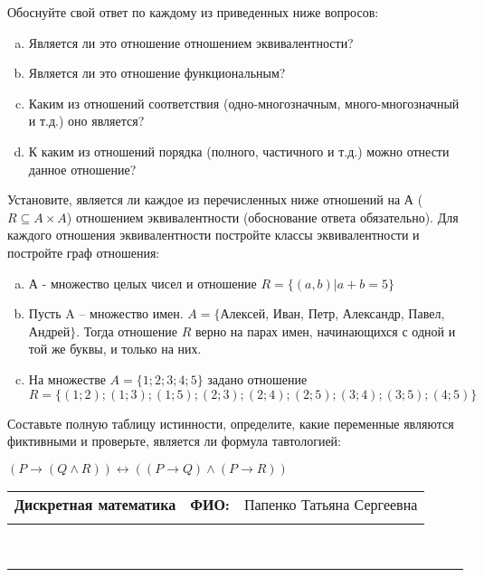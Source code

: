 \documentclass[10pt]{exam}
\newcommand{\class}{Дискретная математика}
\newcommand{\examdate}{}
\begin{document}
\begin{questions}
Обоснуйте свой ответ по каждому из приведенных ниже вопросов:
\begin{enumerate} [a)]\setcounter{enumi}{0}
    \item Является ли это отношение отношением эквивалентности?
    \item Является ли это отношение функциональным?
    \item Каким из отношений соответствия (одно-многозначным, много-многозначный и т.д.) оно является?
    \item К каким из отношений порядка (полного, частичного и т.д.) можно отнести данное отношение?
\end{enumerate}
\question
Установите, является ли каждое из перечисленных ниже отношений на А ($R \subseteq A \times A$) отношением эквивалентности (обоснование ответа обязательно). Для каждого отношения эквивалентности постройте классы 
эквивалентности и постройте граф отношения:
\begin{enumerate} [a)]\setcounter{enumi}{0}
\item А - множество целых чисел и отношение $R = \{(a,b)|a + b = 5\}$
\item Пусть A – множество имен. $A = \{ $Алексей, Иван, Петр, Александр, Павел, Андрей$ \}$. Тогда отношение $R $ верно на парах имен, начинающихся с одной и той же буквы, и только на них.
\item На множестве $A = \{1; 2; 3; 4; 5\}$ задано отношение $R = \{(1; 2); (1; 3); (1; 5); (2; 3); (2; 4); (2; 5); (3; 4); (3; 5); (4; 5)\}$
\end{enumerate}\question Составьте полную таблицу истинности, определите, какие переменные являются фиктивными и проверьте, является ли формула тавтологией:

$(P \rightarrow (Q \land R)) \leftrightarrow ((P \rightarrow Q) \land (P \rightarrow R))$

\end{questions}
\newpage
\begin{flushright}
\begin{tabular}{p{2.8in} r l}
\textbf{\class} & \textbf{ФИО:} &Папенко Татьяна Сергеевна
\\

\textbf{\examdate} &&\\
\end{tabular}\\
\end{flushright}
\rule[1ex]{\textwidth}{.1pt}
\end{document}
